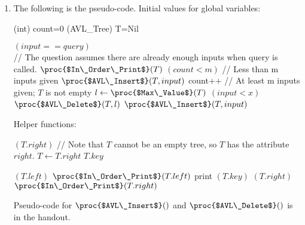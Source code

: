 \documentclass[11pt, answers]{exam}
\theoremstyle{plain}
\theoremstyle{definition}
\begin{document}
\begin{questions}
\begin{solution}
\begin{enumerate}
\item The following is the pseudo-code.
Initial values for global variables:
\begin{codebox}
\li (int) count=0
\li (AVL\_Tree) T=Nil
\end{codebox}

\begin{codebox}
\li \If $(input == query)$ \\// The question assumes there are already enough inputs when query is called.
\li     \Then $\proc{$In\_Order\_Print$}(T)$
\li     \Else
\li     \If $(count < m)$ // Less than m inputs given
\li         \Then $\proc{$AVL\_Insert$}(T, input)$
\li         count++
\li     \Else // At least m inputs given; $T$ is not empty
\li         $l \gets \proc{$Max\_Value$}(T)$
\li         \If $(input<x)$
\li             \Then $\proc{$AVL\_Delete$}(T, l)$
\li             $\proc{$AVL\_Insert$}(T, input)$
\end{codebox}
Helper functions:
\begin{codebox}
\li \While $(T.right)$ // Note that $T$ cannot be an empty tree, so $T$ has the attribute $right$.
\li     \Do $T \gets T.right$ \End
\li \Return $T.key$
\end{codebox}
\begin{codebox}
\li \If $(T.left)$
\li     \Then $\proc{$In\_Order\_Print$}(T.left)$ \End
\li print $(T.key)$
\li \If $(T.right)$
\li     \Then $\proc{$In\_Order\_Print$}(T.right)$ \End
\end{codebox}
Pseudo-code for $\proc{$AVL\_Insert$}()$ and $\proc{$AVL\_Delete$}()$ is in the handout.


\end{enumerate}
\end{solution}
\end{questions}
\end{document}
